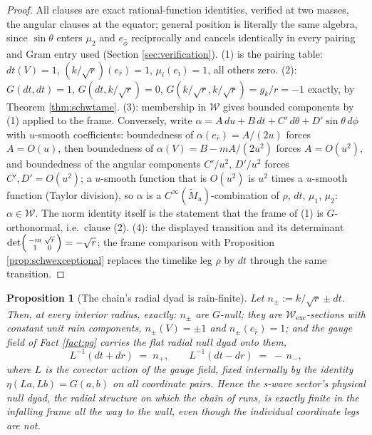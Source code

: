 \documentclass[11pt]{article}
\newtheorem{proposition}[theorem]{Proposition}
\theoremstyle{definition}
\newcommand{\shW}{\mathcal{W}}
\newcommand{\Mt}{\widetilde{M}}
\newcommand{\dtPG}{dt}
\begin{document}
\begin{proof}
All clauses are exact rational-function identities, verified at two masses, the angular clauses at the equator; general position is literally the same algebra, since $\sin\theta$ enters $\mu_2$ and $e_{\hat\phi}$ reciprocally and cancels identically in every pairing and Gram entry used (Section \ref{sec:verification}). (1) is the pairing table: $\dtPG(V) = 1$, $(k/\sqrt r)(e_{\hat r}) = 1$, $\mu_i(e_{\hat\imath}) = 1$, all others zero. (2): $G(\dtPG,\dtPG) = 1$, $G(\dtPG, k/\sqrt r) = 0$, $G(k/\sqrt r, k/\sqrt r) = g_k/r = -1$ exactly, by Theorem \ref{thm:schwtame}. (3): membership in $\shW$ gives bounded components by (1) applied to the frame. Conversely, write $\alpha = A\,du + B\,dt + C'\,d\theta + D'\sin\theta\,d\phi$ with $u$-smooth coefficients: boundedness of $\alpha(e_{\hat r}) = A/(2u)$ forces $A = O(u)$, then boundedness of $\alpha(V) = B - mA/(2u^2)$ forces $A = O(u^2)$, and boundedness of the angular components $C'/u^2$, $D'/u^2$ forces $C', D' = O(u^2)$; a $u$-smooth function that is $O(u^2)$ is $u^2$ times a $u$-smooth function (Taylor division), so $\alpha$ is a $C^\infty(\Mt_u)$-combination of $\rho$, $dt$, $\mu_1$, $\mu_2$: $\alpha \in \shW$. The norm identity itself is the statement that the frame of (1) is $G$-orthonormal, i.e.\ clause (2). (4): the displayed transition and its determinant $\det\begin{psmallmatrix} -m & \sqrt r\\ 1 & 0\end{psmallmatrix} = -\sqrt r$; the frame comparison with Proposition \ref{prop:schwexceptional} replaces the timelike leg $\rho$ by $\dtPG$ through the same transition.
\end{proof}

\begin{proposition}[The chain's radial dyad is rain-finite]\label{prop:dyad}
Let $n_\pm := k/\sqrt r \pm \dtPG$. Then, at every interior radius, exactly: $n_\pm$ are $G$-null; they are $\shW_{\mathrm{exc}}$-sections with \emph{constant unit} rain components, $n_\pm(V) = \pm 1$ and $n_\pm(e_{\hat r}) = 1$; and the gauge field of Fact \ref{fact:pg} carries the flat radial null dyad onto them,
\[
L^{-1}(\dtPG + dr) \;=\; n_+, \qquad L^{-1}(\dtPG - dr) \;=\; -\,n_- ,
\]
where $L$ is the covector action of the gauge field, fixed internally by the identity $\eta(L a, L b) = G(a,b)$ on all coordinate pairs. Hence the s-wave sector's physical null dyad, the radial structure on which the chain of \cite{ButlerT5} runs, is exactly finite in the infalling frame all the way to the wall, even though the individual coordinate legs are not.
\end{proposition}
\end{document}
